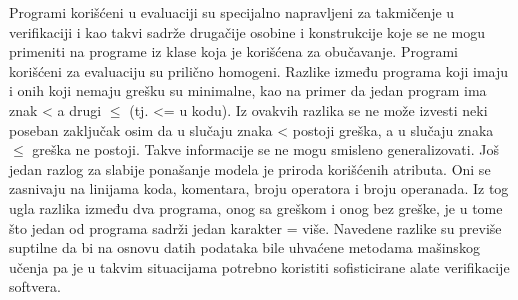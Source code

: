 \documentclass[12pt,oneside]{memoir}
\begin{document}
Programi korišćeni u evaluaciji su specijalno napravljeni za takmičenje u verifikaciji i kao takvi sadrže drugačije osobine i konstrukcije koje se ne mogu primeniti na programe iz klase koja je korišćena za obučavanje. Programi korišćeni za evaluaciju su prilično homogeni. Razlike između programa koji imaju i onih koji nemaju grešku su minimalne, kao na primer da jedan program ima znak < a drugi $\leq$ (tj. <= u kodu). Iz ovakvih razlika se ne može izvesti neki poseban zaključak osim da u slučaju znaka < postoji greška, a u slučaju znaka $\leq$ greška ne postoji. Takve informacije se ne mogu smisleno generalizovati. Još jedan razlog za slabije ponašanje modela je priroda korišćenih atributa. Oni se zasnivaju na linijama koda, komentara, broju operatora i broju operanada. Iz tog ugla razlika između dva programa, onog sa greškom i onog bez greške, je u tome što jedan od programa sadrži jedan karakter = više. Navedene razlike su previše suptilne da bi na osnovu datih podataka bile uhvaćene metodama mašinskog učenja pa je u takvim situacijama potrebno koristiti sofisticirane alate verifikacije softvera.









\end{document}
